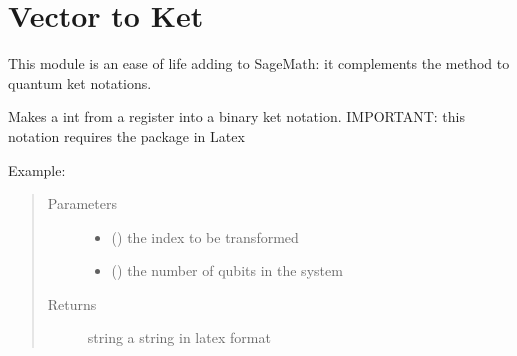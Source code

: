 \documentclass[letterpaper,10pt,english]{sphinxmanual}
\begin{document}
\section{Vector to Ket}
\label{\detokenize{vector_to_ket:module-vector_to_ket}}\label{\detokenize{vector_to_ket:vector-to-ket}}\label{\detokenize{vector_to_ket::doc}}
This module is an ease of life adding to SageMath: it complements the 
method to quantum ket notations.

\begin{fulllineitems}
\label{\detokenize{vector_to_ket:vector_to_ket.int_index_to_ket}}
Makes a int from a register into a binary ket notation.
IMPORTANT: this notation requires the  package in Latex
\begin{description}
\item[{Example:}] \leavevmode
{}%
\begin{sphinxVerbatim}[commandchars=\\\{\},formatcom=\footnotesize]
\end{sphinxVerbatim}

\end{description}
\begin{quote}\begin{description}
\item[{Parameters}] \leavevmode\begin{itemize}
\item {} 
 () \textendash{} the index to be transformed

\item {} 
 () \textendash{} the number of qubits in the system

\end{itemize}

\item[{Returns}] \leavevmode
string \textendash{} a string in latex format

\end{description}\end{quote}

\end{fulllineitems}
\end{document}
